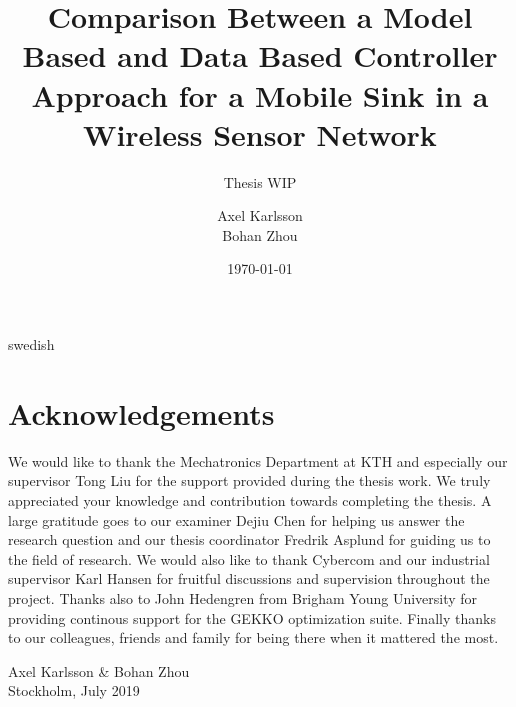 \documentclass[a4paper,11pt]{kth-mag}
\title{Comparison Between a Model Based and Data Based Controller Approach for a Mobile Sink in a Wireless Sensor Network}
\subtitle{Thesis WIP}
\author{Axel Karlsson \\ Bohan Zhou}
\date{\today}
\begin{document}
\frontmatter
\pagestyle{empty}
\maketitle
{}


\clearpage
\begin{abstract}

\end{abstract}
\clearpage
\begin{foreignabstract}{swedish}



\end{foreignabstract}
\clearpage

\chapter*{Acknowledgements}

\noindent We would like to thank the Mechatronics Department at KTH and especially our supervisor Tong Liu for the support provided during the thesis work. We truly appreciated your knowledge and contribution towards completing the thesis. A large gratitude goes to our examiner Dejiu Chen for helping us answer the research question and our thesis coordinator Fredrik Asplund for guiding us to the field of research. We would also like to thank Cybercom and our industrial supervisor Karl Hansen for fruitful discussions and supervision throughout the project. \newline
\newline 
\noindent Thanks also to John Hedengren from Brigham Young University for providing continous support for the GEKKO optimization suite. \newline
\newline   
\noindent Finally thanks to our colleagues, friends and family for being there when it mattered the most. 

    
\begin{flushright}
   Axel Karlsson \& Bohan Zhou \\
   Stockholm, July 2019   
\end{flushright} 

    

\clearpage
\tableofcontents*
\clearpage
\listoffigures*
\clearpage
\listoftables*

\makenomenclature
\renewcommand\nomgroup[1]{
  \item[\bfseries
  \ifstrequal{#1}{T}{Terminology}{\ifstrequal{#1}{S}{Symbols}{\ifstrequal{#1}{A}{Abbreviation}}}]}
\end{document}
